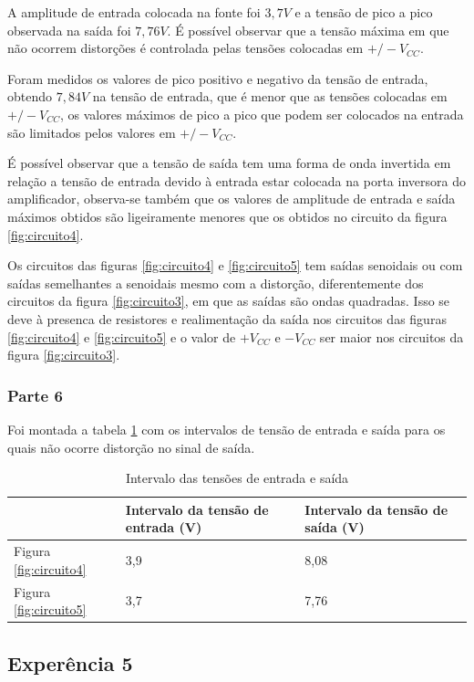 \documentclass{abntex2}
\begin{document}
A amplitude de entrada colocada na fonte foi $3,7V$ e a tensão de pico a pico observada na saída foi $7,76V$. É possível observar que a tensão máxima em que não ocorrem distorções é controlada pelas tensões colocadas em $+/-V_{CC}$.

Foram medidos os valores de pico positivo e negativo da tensão de entrada, obtendo $7,84V$ na tensão de entrada, que é menor que as tensões colocadas em $+/-V_{CC}$, os valores máximos de pico a pico que podem ser colocados na entrada são limitados pelos valores em $+/-V_{CC}$.

É possível observar que a tensão de saída tem uma forma de onda invertida em relação a tensão de entrada devido à entrada estar colocada na porta inversora do amplificador, observa-se também que os valores de amplitude de entrada e saída máximos obtidos são ligeiramente menores que os obtidos no circuito da figura \ref{fig:circuito4}.

Os circuitos das figuras \ref{fig:circuito4} e \ref{fig:circuito5} tem saídas senoidais ou com saídas semelhantes a senoidais mesmo com a distorção, diferentemente dos circuitos da figura \ref{fig:circuito3}, em que as saídas são ondas quadradas. Isso se deve à presenca de resistores e realimentação da saída nos circuitos das figuras \ref{fig:circuito4} e \ref{fig:circuito5} e o valor de $+V_{CC}$ e $-V_{CC}$ ser maior nos circuitos da figura \ref{fig:circuito3}.
\subsubsection{Parte 6}

Foi montada a tabela \ref{tab:exp4} com os intervalos de tensão de entrada e saída para os quais não ocorre distorção no sinal de saída.

\begin{table}[h!]
\centering
\begin{tabular}{|l|l|l|}
  \hline
   & Intervalo da tensão de entrada (V) & Intervalo da tensão de saída (V) \\
  \hline
  Figura \ref{fig:circuito4} & 3,9 & 8,08 \\
  \hline
  Figura \ref{fig:circuito5} & 3,7 & 7,76 \\
  \hline
\end{tabular}
\caption{Intervalo das tensões de entrada e saída}
\label{tab:exp4}
\end{table}

\clearpage

\subsection{Experência 5}
\end{document}
